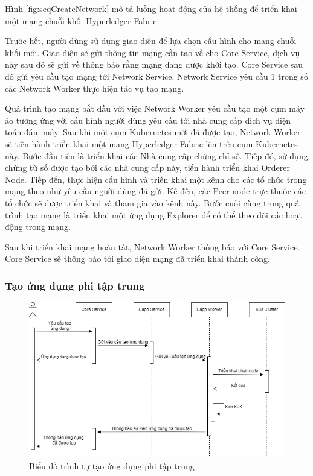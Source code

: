 \documentclass[../DoAn.tex]{subfiles}
\begin{document}
Hình \ref{fig:seqCreateNetwork} mô tả luồng hoạt động của hệ thống để triển
khai một mạng chuỗi khối Hyperledger Fabric.

Trước hết, người dùng sử dụng giao diện để lựa chọn cấu hình cho mạng chuỗi
khối mới. Giao diện sẽ gửi thông tin mạng cần tạo về cho Core Service, dịch vụ
này sau đó sẽ gửi về thông báo rằng mạng đang được khởi tạo. Core Service sau
đó gửi yêu cầu tạo mạng tới Network Service. Network Service yêu cầu 1 trong số
các Network Worker thực hiện tác vụ tạo mạng.

Quá trình tạo mạng bắt đầu với việc Network Worker yêu cầu tạo một cụm máy ảo
tương ứng với cấu hình người dùng yêu cầu tới nhà cung cấp dịch vụ điện toán
đám mây. Sau khi một cụm Kubernetes mới đã được tạo, Network Worker sẽ tiến
hành triển khai một mạng Hyperledger Fabric lên trên cụm Kubernetes này. Bước
đầu tiên là triển khai các Nhà cung cấp chứng chỉ số. Tiếp đó, sử dụng chứng từ số
được tạo bởi các nhà cung cấp này, tiến hành triển khai Orderer Node. Tiếp đến,
thực hiện cấu hình và triển khai một kênh cho các tổ chức trong mạng theo như
yêu cầu người dùng đã gửi. Kế đến, các Peer node trực thuộc các tổ chức sẽ
được triển khai và tham gia vào kênh này. Bước cuối cùng trong quá trình tạo
mạng là triển khai một ứng dụng Explorer để có thể theo dõi các hoạt động trong
mạng.

Sau khi triển khai mạng hoàn tất, Network Worker thông báo với Core Service.
Core Service sẽ thông báo tới giao diện mạng đã triển khai thành công.

\subsubsection{Tạo ứng dụng phi tập trung}

\begin{figure}[H]
    \centering
    \includegraphics[width=0.75\linewidth]{Hinhve/DoAn-SeqCreateDapp.drawio.png}
    \caption{Biểu đồ trình tự tạo ứng dụng phi tập trung}
    \label{fig:seqCreateDapp}
\end{figure}
\end{document}
